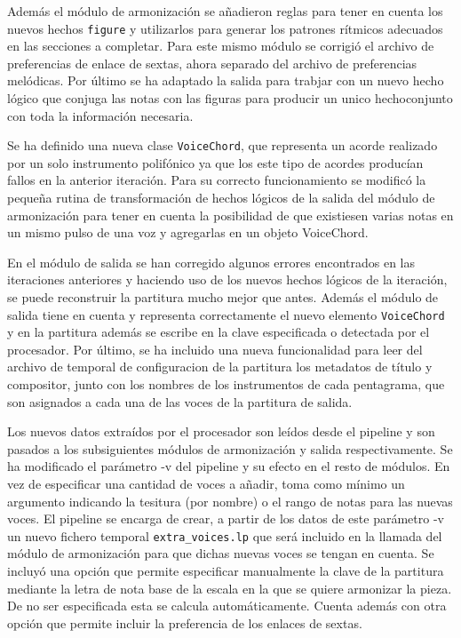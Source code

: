 Además el módulo de armonización se añadieron reglas para tener en cuenta los nuevos hechos \texttt{figure} y utilizarlos para generar los patrones rítmicos adecuados en las secciones a completar. Para este mismo módulo se corrigió el archivo de preferencias de enlace de sextas, ahora separado del archivo de preferencias melódicas. Por último se ha adaptado la salida para trabjar con un nuevo hecho lógico que conjuga las notas con las figuras para producir un unico hechoconjunto con toda la información necesaria.

Se ha definido una nueva clase \texttt{VoiceChord}, que representa un acorde realizado por un solo instrumento polifónico ya que los este tipo de acordes producían fallos en la anterior iteración. Para su correcto funcionamiento se modificó la pequeña rutina de transformación de hechos lógicos de la salida del módulo de armonización para tener en cuenta la posibilidad de que existiesen varias notas en un mismo pulso de una voz y agregarlas en un objeto VoiceChord.

En el módulo de salida se han corregido algunos errores encontrados en las iteraciones anteriores y haciendo uso de los nuevos hechos lógicos de la iteración, se puede reconstruir la partitura mucho mejor que antes. Además el módulo de salida tiene en cuenta y representa correctamente el nuevo elemento \texttt{VoiceChord} y en la partitura además se escribe en la clave especificada o detectada por el procesador. Por último, se ha incluido una nueva funcionalidad para leer del archivo de temporal de configuracion de la partitura los metadatos de título y compositor, junto con los nombres de los instrumentos de cada pentagrama, que son asignados a cada una de las voces de la partitura de salida.

Los nuevos datos extraídos por el procesador son leídos desde el pipeline y son pasados a los subsiguientes módulos de armonización y salida respectivamente. Se ha modificado el parámetro -v del pipeline y su efecto en el resto de módulos. En vez de especificar una cantidad de voces a añadir, toma como mínimo un argumento indicando la tesitura (por nombre) o el rango de notas para las nuevas voces. El pipeline se encarga de crear, a partir de los datos de este parámetro -v un nuevo fichero temporal \texttt{extra\_voices.lp} que será incluido en la llamada del módulo de armonización para que dichas nuevas voces se tengan en cuenta. Se incluyó una opción que permite especificar manualmente la clave de la partitura mediante la letra de nota base de la escala en la que se quiere armonizar la pieza. De no ser especificada esta se calcula automáticamente. Cuenta además con otra opción que permite incluir la preferencia de los enlaces de sextas.

